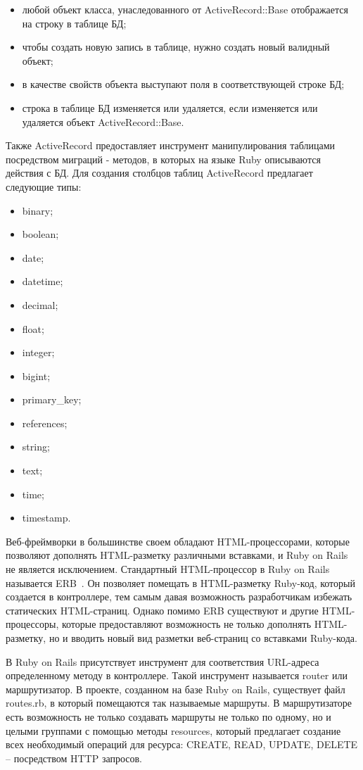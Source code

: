 \begin{itemize}
  \item любой объект класса, унаследованного от ActiveRecord::Base отображается на строку в таблице БД;
  \item чтобы создать новую запись в таблице, нужно создать новый валидный объект;
  \item в качестве свойств объекта выступают поля в соответствующей строке БД;
  \item строка в таблице БД изменяется или удаляется, если изменяется или удаляется объект ActiveRecord::Base.
\end{itemize}

Также ActiveRecord предоставляет инструмент манипулирования таблицами посредством миграций - методов, в которых на языке Ruby описываются действия с БД. Для создания столбцов таблиц ActiveRecord предлагает следующие типы:

\begin{itemize}
  \item binary;
  \item boolean;
  \item date;
  \item datetime;
  \item decimal;
  \item float;
  \item integer;
  \item bigint;
  \item primary\_key;
  \item references;
  \item string;
  \item text;
  \item time;
  \item timestamp.
\end{itemize}

Веб-фреймворки в большинстве своем обладают HTML-процессорами, которые позволяют дополнять HTML-разметку различными вставками, и Ruby on Rails не является исключением. Стандартный HTML-процессор в Ruby on Rails называется ERB~\cite{erb_doc}. Он позволяет помещать в HTML-разметку Ruby-код, который создается в контроллере, тем самым давая возможность разработчикам избежать статических HTML-страниц. Однако помимо ERB существуют и другие HTML-процессоры, которые предоставляют возможность не только дополнять HTML-разметку, но и вводить новый вид разметки веб-страниц со вставками Ruby-кода.

В Ruby on Rails присутствует инструмент для соответствия URL-адреса определенному методу в контроллере. Такой инструмент называется router или маршрутизатор. В проекте, созданном на базе Ruby on Rails, существует файл routes.rb, в который помещаются так называемые маршруты. В маршрутизаторе есть возможность не только создавать маршруты не только по одному, но и целыми группами с помощью методы resources, который предлагает создание всех необходимый операций для ресурса: CREATE, READ, UPDATE, DELETE -- посредством HTTP запросов.

